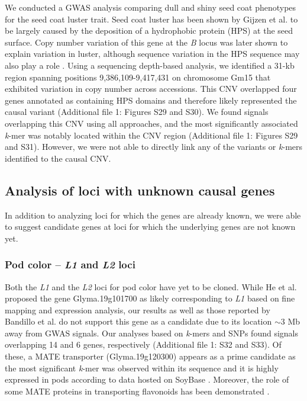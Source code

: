 \documentclass{article}
\begin{document}
We conducted a GWAS analysis comparing dull and shiny seed coat phenotypes for
the seed coat luster trait. Seed coat luster has been shown by
Gijzen et al. \cite{gijzen1999} to be largely caused by the deposition of a hydrophobic
protein (HPS) at the seed surface. Copy number variation of this gene at the
\textit{B} locus was later shown to explain variation in luster, although
sequence variation in the HPS sequence may also play a role \citep{gijzen2006}.
Using a sequencing depth-based analysis, we identified a 31-kb region spanning
positions 9,386,109-9,417,431 on chromosome Gm15 that exhibited variation in
copy number across accessions. This CNV overlapped four genes annotated as
containing HPS domains and therefore likely represented the causal variant
(Additional file 1: Figures S29 and
S30).  We found signals overlapping this
CNV using all approaches, and the most significantly associated \textit{k}-mer
was notably located within the CNV region (Additional file 1: Figures
S29 and
S31). However, we were not able to
directly link any of the variants or \textit{k}-mers identified to the causal
CNV.

\subsection*{Analysis of loci with unknown causal genes}

In addition to analyzing loci for which the genes are already known, we were
able to suggest candidate genes at loci for which the underlying genes are not
known yet. 

\subsubsection*{Pod color -- \textit{L1} and \textit{L2} loci}

Both the \textit{L1} and the \textit{L2} loci for pod color have yet to be
cloned. While He et al. \cite{he2015} proposed the gene Glyma.19g101700 as likely
corresponding to \textit{L1} based on fine mapping and expression analysis, our
results as well as those reported by Bandillo et al. \cite{bandillo2017} do not support this
gene as a candidate due to its location $\sim$3 Mb away from GWAS signals. Our
analyses based on \textit{k}-mers and SNPs found signals overlapping 14 and
6 genes, respectively (Additional file 1: S32 and
S33). Of these, a MATE transporter (Glyma.19g120300)
appears as a prime candidate as the most significant \emph{k}-mer was observed
within its sequence and it is highly expressed in pods according to data hosted
on SoyBase \citep{grant2010, severin2010}. Moreover, the role of some MATE
proteins in transporting flavonoids has been demonstrated \citep{chen2015}.
\end{document}
